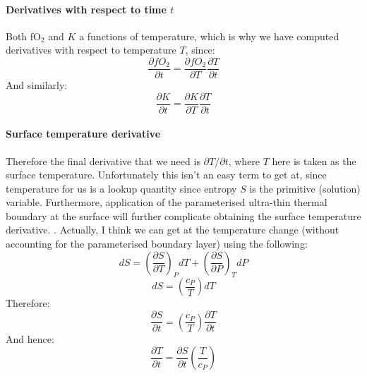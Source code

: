 \paragraph{Derivatives with respect to time $t$}
Both fO$_2$ and $K$ a functions of temperature, which is why we have computed derivatives with respect to temperature $T$, since:
\begin{equation}
\frac{\partial fO_2}{\partial t} = \frac{\partial fO_2}{\partial T} \frac{\partial T}{\partial t}
\end{equation}
And similarly:
\begin{equation}
\frac{\partial K}{\partial t} = \frac{\partial K}{\partial T} \frac{\partial T}{\partial t}
\end{equation}
\paragraph{Surface temperature derivative}
Therefore the final derivative that we need is $\partial T/\partial t$, where $T$ here is taken as the surface temperature.  Unfortunately this isn't an easy term to get at, since temperature for us is a lookup quantity since entropy $S$ is the primitive (solution) variable.  Furthermore, application of the parameterised ultra-thin thermal boundary at the surface will further complicate obtaining the surface temperature derivative.  .  Actually, I think we can get at the temperature change (without accounting for the parameterised boundary layer) using the following:
\begin{equation}
dS = \left( \frac{\partial S}{\partial T} \right)_P dT + \left( \frac{\partial S}{\partial P} \right)_T dP
\end{equation}
\begin{equation}
dS = \left( \frac{c_P}{T} \right) dT
\end{equation}
Therefore:
\begin{equation}
\frac{\partial S}{\partial t} = \left( \frac{c_P}{T} \right) \frac{\partial T}{\partial t}
\end{equation}
And hence:
\begin{equation}
\frac{\partial T}{\partial t} = \frac{\partial S}{\partial t} \left( \frac{T}{c_P} \right)
\end{equation}

